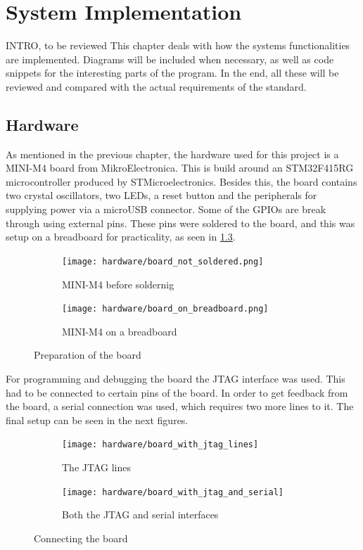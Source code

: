 
\newcommand{\excreturn}{EXC\_RETURN}

\chapter{System Implementation}
{INTRO, to be reviewed}
This chapter deals with how the system\textquotesingle s functionalities 
are implemented. Diagrams will be included when necessary, as well as code 
snippets for the interesting parts of the program. In the end, all these
will be reviewed and compared with the actual requirements of the standard.


\section{Hardware}

As mentioned in the previous chapter, the hardware used for this project 
is a MINI-M4 board from MikroElectronica. This is build around an
STM32F415RG microcontroller produced by STMicroelectronics. Besides
this, the board contains two crystal oscillators, two LEDs, a reset 
button and the peripherals for supplying power via a microUSB connector.
Some of the GPIOs are break through using external pins.
These pins were soldered to the board, and this was setup on a breadboard
for practicality, as seen in \ref{fig:photo1}.

\begin{figure}[H]
\begin{subfigure}{0.5\textwidth}
  \centering
  \texttt{[image: hardware/board\_not\_soldered.png]}
  \caption{MINI-M4 before soldernig}
  \label{fig:sub1}
\end{subfigure}%
\begin{subfigure}{0.5\textwidth}
  \centering
  \texttt{[image: hardware/board\_on\_breadboard.png]}
  \caption{MINI-M4 on a breadboard}
  \label{fig:sub2}
\end{subfigure}
\caption{Preparation of the board}
\label{fig:photo1}
\end{figure}

For programming and debugging the board the JTAG interface was used.
This had to be connected to certain pins of the board. In order to get 
feedback from the board, a serial connection was used, which requires two
more lines to it. The final setup can be seen in the next figures.

\begin{figure}[H]
\centering
\begin{subfigure}{.5\textwidth}
  \centering
  \texttt{[image: hardware/board\_with\_jtag\_lines]}
  \caption{The JTAG lines}
  \label{fig:sub1}
\end{subfigure}%
\begin{subfigure}{.5\textwidth}
  \centering
  \texttt{[image: hardware/board\_with\_jtag\_and\_serial]}
  \caption{Both the JTAG and serial interfaces}
  \label{fig:sub2}
\end{subfigure}
\caption{Connecting the board}
\label{fig:photo2}
\end{figure}

